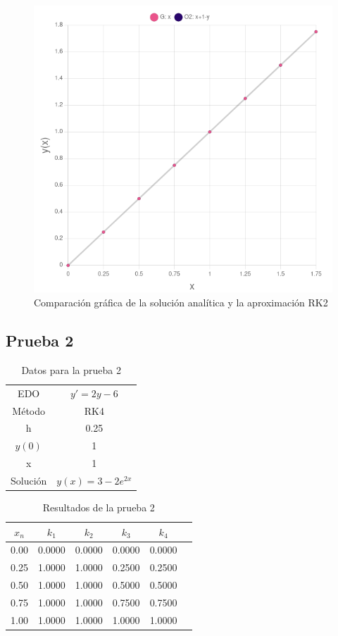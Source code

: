 \documentclass[article, 11pt]{IEEEtran}   %
\begin{document}
\begin{figure}[H]									%
\centering
\includegraphics[scale=0.35]{graficaProblema1}%
\caption{Comparación gráfica de la solución analítica y la aproximación RK2}\label{diagram2}  %
\end{figure}

\subsection{Prueba 2}
\begin{table}[H]
\centering
\caption{Datos para la prueba 2}
\label{DataTable3}
\begin{tabular}{|c|c|}
\hline
EDO & $y\prime=2y-6$\\
Método & RK4\\
h & 0.25\\  
$y(0)$ & 1\\
x & 1\\
Solución & $y(x)=3-2e^{2x}$\\
\hline   
\end{tabular}
\end{table}

\begin{table}[H]
\centering
\caption{Resultados de la prueba 2}
\label{DataTable2}
\begin{tabular}{|c|c|c|c|c|c|}
\hline
$x_n$ & $k_1$ & $k_2$ & $k_3$ & $k_4$ \\
\hline
0.00 & 0.0000 & 0.0000 & 0.0000 & 0.0000\\
0.25 & 1.0000 & 1.0000 & 0.2500 & 0.2500\\
0.50 & 1.0000 & 1.0000 & 0.5000 & 0.5000\\
0.75 & 1.0000 & 1.0000 & 0.7500 & 0.7500\\
1.00 & 1.0000 & 1.0000 & 1.0000 & 1.0000\\
\hline   
\end{tabular}
\end{table}
\end{document}
